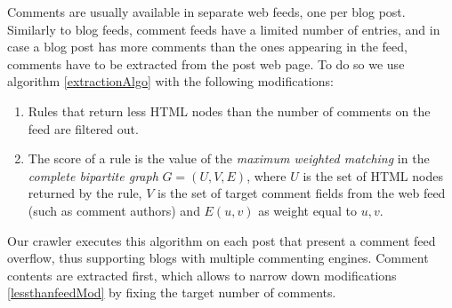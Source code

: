 Comments are usually available in separate web feeds, one per blog post. Similarly to blog feeds, comment feeds have a limited number of entries, and in case a blog post has more comments than the ones appearing in the feed, comments have to be extracted from the post web page. To do so we use algorithm \ref{extractionAlgo} with the following modifications:
\begin{enumerate}
  \item\label{lessthanfeedMod} Rules that return less HTML nodes than the number of comments on the feed are filtered out.
  \item\label{assignmentMod} The score of a rule is the value of the \emph{maximum weighted matching} in the \emph{complete bipartite graph} $G = (U, V, E)$, where $U$ is the set of HTML nodes returned by the rule, $V$ is the set of target comment fields from the web feed (such as comment authors) and $E(u, v)$ as weight equal to \code{\ref{similarityAlgo}(}$u, v$\code{)}.
\end{enumerate}
Our crawler executes this algorithm on each post that present a comment feed overflow, thus supporting blogs with multiple commenting engines. Comment contents are extracted first, which allows to narrow down modifications \ref{lessthanfeedMod} by fixing the target number of comments.
